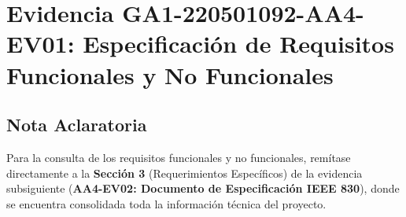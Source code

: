 \chapter*{Evidencia GA1-220501092-AA4-EV01: Especificación de Requisitos Funcionales y No Funcionales}
{}
\setcounter{section}{0}

\section*{Nota Aclaratoria}

Para la consulta de los requisitos funcionales y no funcionales, remítase directamente a la \textbf{Sección 3} (Requerimientos Específicos) de la evidencia subsiguiente (\textbf{AA4-EV02: Documento de Especificación IEEE 830}), donde se encuentra consolidada toda la información técnica del proyecto.
